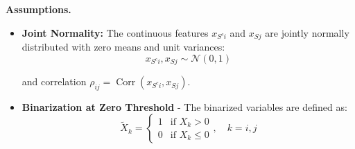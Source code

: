 \noindent\textbf{Assumptions.}

\begin{itemize}
	\item [1.] \textbf{Joint Normality:} The continuous features $ x_{{S^c}i} $ and $ x_{Sj} $ are jointly normally distributed with zero means and unit variances:
	\begin{equation}\label{eq:app-lemma3-standard-normal-assumption}
	x_{{S^c}i}, x_{Sj} \sim \mathcal{N}(0, 1)
	\end{equation}
	
	and correlation $ \rho_{ij} = \operatorname{Corr}(x_{{S^c}i}, x_{Sj}) $.
	
	\item [2.] \textbf{Binarization at Zero Threshold} -  The binarized variables are defined as:
	\begin{equation}\label{eq:app-lemma3-binarization-definition}
	\tilde{X}_k = \begin{cases}
		1 & \text{if } X_k > 0 \\
		0 & \text{if } X_k \leq 0
	\end{cases}, \quad k = i, j
	\end{equation}
\end{itemize}	

